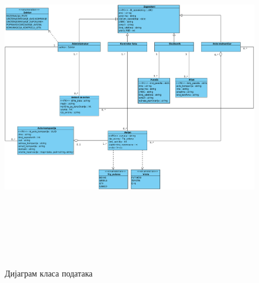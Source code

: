 \documentclass{article}
\begin{document}
\begin{figure}[H]
    \begin{center}
        \includegraphics[width=1.1\textwidth, height=15cm]{Dijagrami_slike/dijagram_klasa_podataka.jpg}
        \caption{Дијаграм класа података}
    \end{center}
\end{figure}
\end{document}
